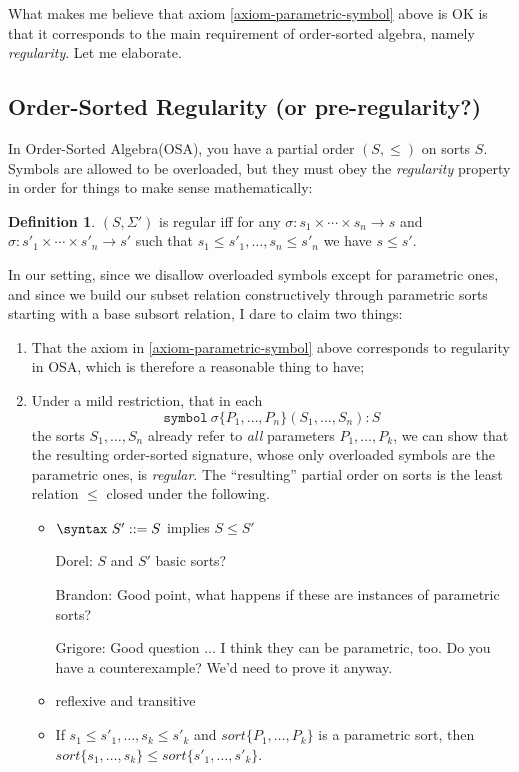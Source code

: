 \documentclass{article}
\newcommand\comment[2]{\par\noindent\color{red}#1: #2\color{black}\par\noindent}
\newcommand\dl{\comment{Dorel}}
\newcommand\gr{\comment{Grigore}}
\theoremstyle{definition}
\theoremstyle{definition}
\theoremstyle{definition}
\newtheorem{definition}{Definition}[section]
\theoremstyle{definition}
\theoremstyle{definition}
\theoremstyle{theorem}
\theoremstyle{theorem}
\theoremstyle{theorem}
\theoremstyle{theorem}
\theoremstyle{theorem}
\newcommand{\Sort}[1]{\textit{sort}\{#1\}}
\newcommand{\KWsymbol}{\texttt{symbol}}
\begin{document}
What makes me believe that axiom \ref{axiom-parametric-symbol}
above is OK is that it corresponds to the main requirement of
order-sorted algebra, namely \emph{regularity}.
Let me elaborate.

\subsection{Order-Sorted Regularity (or pre-regularity?)}
In Order-Sorted Algebra(OSA), you have a partial order \((S,\le)\) on sorts \(S\).
Symbols are allowed to be overloaded, but they must obey the
\emph{regularity} property in order for things to make sense
mathematically:

\begin{definition}
\((S,\Sigma')\) is regular iff for any
\(\sigma:s_1\times\cdots\times s_n \rightarrow s\) and
\(\sigma:s'_1\times\cdots\times s'_n \rightarrow s'\) such that
\(s_1\le s'_1,\ldots,s_n\le s'_n\) we have \(s \le s'\).
\end{definition}

In our setting, since we disallow overloaded
symbols except for parametric ones, and since we build
our subset relation constructively through
parametric sorts starting with a base subsort relation,
I dare to claim two things:
\begin{enumerate}[label={(\alph*)}]
\item That the axiom in \ref{axiom-parametric-symbol} above corresponds to
regularity in OSA, which is therefore a
reasonable thing to have;
\item Under a mild restriction, that in each
\[\KWsymbol\ \sigma\{P_1,\ldots,P_n\}(S_1,\ldots,S_n):S\]
the sorts \(S_1,\ldots,S_n\) already refer to \emph{all} parameters
\(P_1,\ldots,P_k\), we can show that the resulting order-sorted
signature, whose only overloaded symbols are the parametric ones, is
\emph{regular}.
The ``resulting'' partial order on sorts is the least relation \(\le\)
closed under the following.
\begin{itemize}
\item \(\syntax\ S'::=S\) implies \(S \le S'\)
\dl{$S$ and $S'$ basic sorts?}
\comment{Brandon}{Good point, what happens if these are instances of parametric sorts?}
\gr{Good question ... I think they can be parametric, too.  Do you have a counterexample?  We'd need to prove it anyway.}
\item reflexive and transitive
\item If \(s_1\le s'_1,\ldots,s_k\le s'_k\) and
\(\Sort{P_1,\ldots,P_k}\) is a parametric sort,
then \(\Sort{s_1,\ldots,s_k} \le \Sort{s'_1,\ldots,s'_k}\).
\end{itemize}
\end{enumerate}
\end{document}

